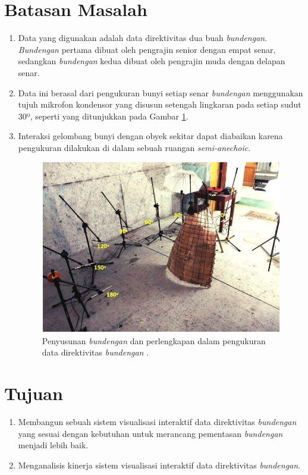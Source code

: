 \section{Batasan Masalah}
\begin{enumerate}
    \item Data yang digunakan adalah data direktivitas dua buah \textit{bundengan}. \textit{Bundengan} pertama dibuat oleh pengrajin senior dengan empat senar, sedangkan \textit{bundengan} kedua dibuat oleh pengrajin muda dengan delapan senar.
    \item Data ini berasal dari pengukuran bunyi setiap senar \textit{bundengan} menggunakan tujuh mikrofon kondensor yang disusun setengah lingkaran pada setiap sudut 30º, seperti yang ditunjukkan pada Gambar \ref{fig:bundenganBatasanMasalah}.
    \item Interaksi gelombang bunyi dengan obyek sekitar dapat diabaikan karena pengukuran dilakukan di dalam sebuah ruangan \textit{semi-anechoic}.
    \begin{figure}[h!]
        \centering
        \includegraphics[width=10 cm]{Gambar/bundenganBatasanMasalah.jpg}
        \caption{Penyusunan \textit{bundengan} dan perlengkapan dalam pengukuran data direktivitas \textit{bundengan} \cite{prosidingDirektivitas}.}
        \label{fig:bundenganBatasanMasalah}
    \end{figure}
\end{enumerate}


\section{Tujuan}
\begin{enumerate}
    \item Membangun sebuah sistem visualisasi interaktif data direktivitas \textit{bundengan} yang sesuai dengan kebutuhan untuk merancang pementasan \textit{bundengan} menjadi lebih baik.
    \item Menganalisis kinerja sistem visualisasi interaktif data direktivitas \textit{bundengan}.
\end{enumerate}


